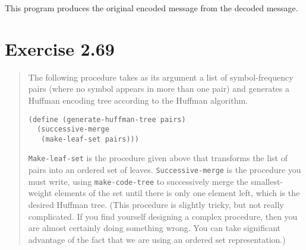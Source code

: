 \documentclass{article}
\begin{document}


This program produces the original encoded message from the decoded message.

\section{Exercise 2.69}
\begin{quote}
    The following procedure takes as its argument a list of symbol-frequency
    pairs (where no symbol appears in more than one pair) and generates a
    Huffman encoding tree according to the Huffman algorithm.

    \begin{lstlisting}
(define (generate-huffman-tree pairs)
  (successive-merge
   (make-leaf-set pairs)))
    \end{lstlisting}

    \texttt{Make-leaf-set} is the procedure given above that transforms the
    list of pairs into an ordered set of leaves. \texttt{Successive-merge} is
    the procedure you must write, using \texttt{make-code-tree} to successively
    merge the smallest-weight elements of the set until there is only one
    element left, which is the desired Huffman tree. (This procedure is
    slightly tricky, but not really complicated. If you find yourself designing
    a complex procedure, then you are almost certainly doing something wrong.
    You can take significant advantage of the fact that we are using an ordered
    set representation.)
\end{quote}
\end{document}
